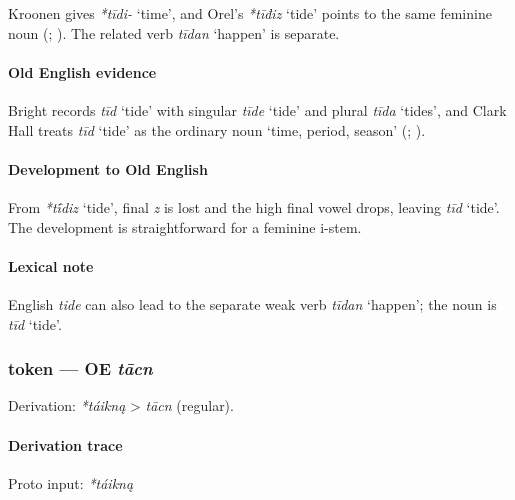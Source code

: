 \documentclass[
  british,
  a4paper,
]{article}
\providecommand{\Recon}[1]{\emph{*#1}}
\begin{document}
Kroonen gives \emph{*tīdi-} `time', and Orel's \Recon{tīđiz} `tide'
points to the same feminine noun (; ). The related verb
\emph{tīdan} `happen' is separate.

\paragraph{Old English evidence}\label{old-english-evidence-69}

Bright records \emph{tīd} `tide' with singular \emph{tīde} `tide' and
plural \emph{tīda} `tides', and Clark Hall treats \emph{tīd} `tide' as
the ordinary noun `time, period, season'
(;
).

\paragraph{Development to Old
English}\label{development-to-old-english-68}

From \Recon{tī́diz} `tide', final \emph{z} is lost and the high final
vowel drops, leaving \emph{tīd} `tide'. The development is
straightforward for a feminine i-stem.

\paragraph{Lexical note}\label{lexical-note-1}

English \emph{tide} can also lead to the separate weak verb \emph{tīdan}
`happen'; the noun is \emph{tīd} `tide'.

\subsubsection{\texorpdfstring{token --- OE
\emph{tācn}}{token --- OE tācn}}\label{token-oe-tux101cn}

Derivation: \emph{*táikną} \textgreater{} \emph{tācn} (regular).

\paragraph{Derivation trace}\label{derivation-trace-87}

Proto input: \emph{*táikną}

\begingroup
\setlength{\fboxsep}{6pt}
\end{document}
